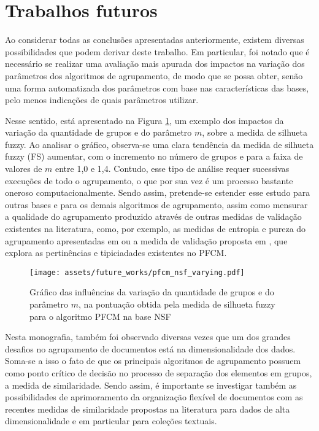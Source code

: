 \section{Trabalhos futuros}

Ao considerar todas as conclusões apresentadas anteriormente, existem diversas possibilidades que
podem derivar deste trabalho. Em particular, foi notado que é necessário se realizar uma avaliação
mais apurada dos impactos na variação dos parâmetros dos algoritmos de agrupamento, de modo que se
possa obter, senão uma forma automatizada dos parâmetros com base nas características das bases,
pelo menos indicações de quais parâmetros utilizar. 

Nesse sentido, está apresentado na Figura \ref{fig:pfcmvarying}, um exemplo dos impactos da variação
da quantidade de grupos e do parâmetro $m$, sobre a medida de silhueta fuzzy. Ao analisar o gráfico,
observa-se uma clara tendência da medida de silhueta fuzzy (FS) aumentar, com o incremento no número
de grupos e para a faixa de valores de $m$ entre 1,0 e 1,4. Contudo, esse tipo de análise requer
sucessivas execuções de todo o agrupamento, o que por sua vez é um processo bastante oneroso
computacionalmente. Sendo assim, pretende-se estender esse estudo para outras bases e para os
demais algoritmos de agrupamento, assim como mensurar a qualidade do agrupamento produzido
através de outras medidas de validação existentes na literatura, como, por exemplo, as medidas de
entropia e pureza do agrupamento apresentadas em  ou a medida de validação
proposta em , que explora as pertinências e tipiciadades existentes no
PFCM.

\begin{figure}[!h] \centering 
  \centering
  \texttt{[image: assets/future\_works/pfcm\_nsf\_varying.pdf]} 
  \caption{Gráfico das influências da variação da quantidade de grupos e do parâmetro $m$, na
pontuação obtida pela medida de silhueta fuzzy para o algoritmo PFCM na base NSF} 
  \label{fig:pfcmvarying}
\end{figure}

Nesta monografia, também foi observado diversas vezes que um dos grandes desafios no agrupamento de
documentos está na dimensionalidade dos dados. Soma-se a isso o fato de que os principais algoritmos
de agrupamento possuem como ponto crítico de decisão no processo de separação dos elementos em
grupos, a medida de similaridade. Sendo assim, é importante se investigar também as possibilidades de
aprimoramento da organização flexível de documentos com as recentes medidas de similaridade
propostas na literatura \cite{Lin2014,Nagwani2015} para dados de alta dimensionalidade e em
particular para coleções textuais.

